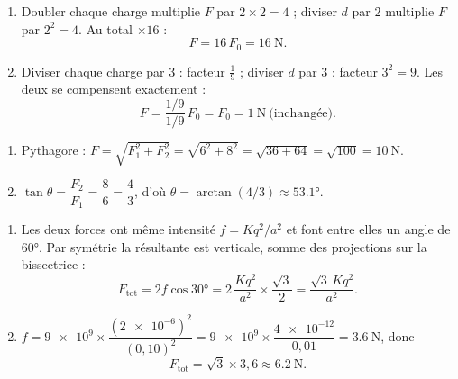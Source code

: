\documentclass[11pt,a4paper]{article}
\begin{document}

\begin{corrige}
\begin{enumerate}[label=\alph*)]
  \item Doubler chaque charge multiplie $F$ par $2\times 2 = 4$ ; diviser $d$ par $2$ multiplie $F$
        par $2^2 = 4$. Au total $\times 16$ :
        \[ F = 16\,F_0 = \SI{16}{\newton}. \]
  \item Diviser chaque charge par $3$ : facteur $\tfrac{1}{9}$ ; diviser $d$ par $3$ : facteur
        $3^2 = 9$. Les deux se compensent exactement :
        \[ F = \frac{1/9}{1/9}\,F_0 = F_0 = \SI{1}{\newton}\ \text{(inchangée)}. \]
\end{enumerate}
\end{corrige}

\begin{corrige}
\begin{enumerate}[label=\alph*)]
  \item Pythagore : $F = \sqrt{F_1^2 + F_2^2} = \sqrt{6^2 + 8^2} = \sqrt{36+64} = \sqrt{100} = \SI{10}{\newton}$.
  \item $\tan\theta = \dfrac{F_2}{F_1} = \dfrac{8}{6} = \dfrac{4}{3}$, d'où $\theta = \arctan(4/3) \approx \ang{53.1}$.
\end{enumerate}
\end{corrige}

\begin{corrige}
\begin{enumerate}[label=\alph*)]
  \item Les deux forces ont même intensité $f = K q^2/a^2$ et font entre elles un angle de
        $\ang{60}$. Par symétrie la résultante est verticale, somme des projections sur la
        bissectrice :
        \[ F_{\text{tot}} = 2 f\cos\ang{30} = 2\,\frac{K q^2}{a^2}\times\frac{\sqrt3}{2}
             = \frac{\sqrt3\,K q^2}{a^2}. \]
  \item $f = \num{9e9}\times\dfrac{(\num{2e-6})^2}{(0{,}10)^2} = \num{9e9}\times\dfrac{\num{4e-12}}{0{,}01} = \SI{3.6}{\newton}$, donc
        \[ F_{\text{tot}} = \sqrt3\times 3{,}6 \approx \SI{6.2}{\newton}. \]
\end{enumerate}
\end{corrige}
\end{document}
